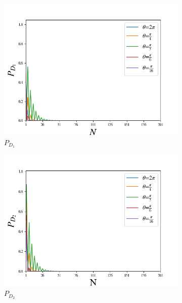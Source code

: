 \documentclass{book}
\begin{document}
\begin{figure}[!t]
\centering
\begin{subfigure}[b]{0.45\linewidth}
\includegraphics[width=\linewidth]{images/BsFijo_azumaD1.png}
\caption{$P_{D_{1}}$}
\label{fig:BS1}
\end{subfigure}
\begin{subfigure}[b]{0.45\linewidth}
\includegraphics[width=\linewidth]{images/BsFijo_azumaD2.png}
\caption{$P_{D_{2}}$}
\label{fig:westminster_aerea}
\end{subfigure}
\begin{subfigure}[b]{0.45\linewidth}

\end{subfigure}
\end{figure}
\end{document}

